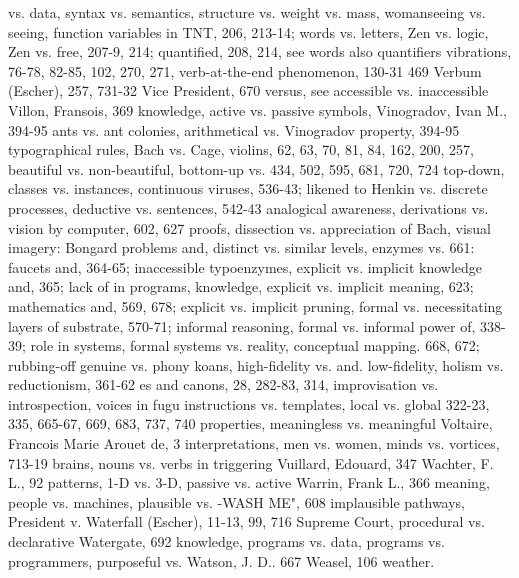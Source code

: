 vs. data, syntax vs. semantics, structure vs.    weight vs. mass, womanseeing vs. seeing,
function variables in TNT, 206, 213-14;          words vs. letters, Zen vs. logic, Zen vs.
free, 207-9, 214; quantified, 208, 214, see      words
also quantifiers                                 vibrations, 76-78, 82-85, 102, 270, 271,
verb-at-the-end phenomenon, 130-31               469
Verbum (Escher), 257, 731-32                     Vice President, 670
versus, see accessible vs. inaccessible          Villon, Fransois, 369
knowledge, active vs. passive symbols,           Vinogradov, Ivan M., 394-95
ants vs. ant colonies, arithmetical vs.          Vinogradov property, 394-95
typographical rules, Bach vs. Cage,              violins, 62, 63, 70, 81, 84, 162, 200, 257,
beautiful vs. non-beautiful, bottom-up vs.       434, 502, 595, 681, 720, 724
top-down, classes vs. instances, continuous      viruses, 536-43; likened to Henkin
vs. discrete processes, deductive vs.            sentences, 542-43
analogical awareness, derivations vs.            vision by computer, 602, 627
proofs, dissection vs. appreciation of Bach,     visual imagery: Bongard problems and,
distinct vs. similar levels, enzymes vs.         661: faucets and, 364-65; inaccessible
typoenzymes,      explicit     vs.    implicit   knowledge and, 365; lack of in programs,
knowledge, explicit vs. implicit meaning,        623; mathematics and, 569, 678;
explicit vs. implicit pruning, formal vs.        necessitating layers of substrate, 570-71;
informal reasoning, formal vs. informal          power of, 338-39; role in
systems, formal systems vs. reality,             conceptual mapping. 668, 672; rubbing-off
genuine vs. phony koans, high-fidelity vs.       and.
low-fidelity, holism vs. reductionism,           361-62 es and canons, 28, 282-83, 314,
improvisation         vs.       introspection,   voices in fugu
instructions vs. templates, local vs. global     322-23, 335, 665-67, 669, 683, 737, 740
properties, meaningless vs. meaningful           Voltaire, Francois Marie Arouet de, 3
interpretations, men vs. women, minds vs.        vortices, 713-19
brains, nouns vs. verbs in triggering            Vuillard, Edouard, 347 Wachter, F. L., 92
patterns, 1-D vs. 3-D, passive vs. active        Warrin, Frank L., 366
meaning, people vs. machines, plausible vs.      -WASH ME", 608
implausible pathways, President v.               Waterfall (Escher), 11-13, 99, 716
Supreme Court, procedural vs. declarative        Watergate, 692
knowledge, programs vs. data, programs
vs.     programmers,       purposeful      vs.   Watson, J. D.. 667 Weasel, 106 weather.
